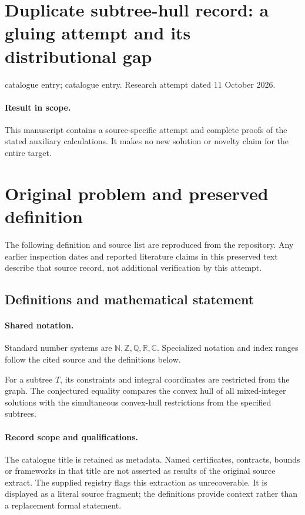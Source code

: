\documentclass[11pt]{article}
\begin{document}
\section*{Duplicate subtree-hull record: a gluing attempt and its distributional gap}
\noindent catalogue entry; catalogue entry. Research attempt dated 11 October 2026.
\paragraph{Result in scope.}This manuscript contains a source-specific attempt and complete proofs of the stated auxiliary calculations. It makes no new solution or novelty claim for the entire target.
\section{Original problem and preserved definition}
The following definition and source list are reproduced from the repository. Any earlier inspection dates and reported literature claims in this preserved text describe that source record, not additional verification by this attempt.
\subsection{Definitions and mathematical statement}

\paragraph{Shared notation.}Standard number systems are $\mathbb N,\mathbb Z,\mathbb Q,\mathbb R,\mathbb C$. Specialized notation and index ranges follow the cited source and the definitions below.


For a subtree $T$, its constraints and integral coordinates are restricted from the graph. The conjectured equality compares the convex hull of all mixed-integer solutions with the simultaneous convex-hull restrictions from the specified subtrees.
\paragraph{Record scope and qualifications.}
The catalogue title is retained as metadata. Named certificates, contracts, bounds or frameworks in that title are not asserted as results of the original source extract.
The supplied registry flags this extraction as unrecoverable. It is displayed as a literal source fragment; the definitions provide context rather than a replacement formal statement.
\end{document}
